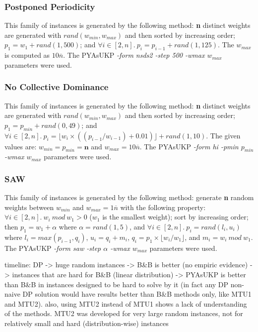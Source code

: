 \subsubsection{Postponed Periodicity}
This family of instances is generated by the following method: \textbf{n} distinct weights are generated with \(rand(w_{min}, w_{max})\) and then sorted by increasing order; \(p_1 = w_1 + rand(1, 500)\); and \(\forall i \in [2, n].~p_i = p_{i-1} + rand(1, 125)\). The \(w_{max}\) is computed as \(10\overline{n}\). The PYAsUKP \emph{-form nsds2 -step 500 -wmax \(w_{max}\)} parameters were used.

\subsubsection{No Collective Dominance}
This family of instances is generated by the following method: \textbf{n} distinct weights are generated with \(rand(w_{min}, w_{max})\) and then sorted by increasing order; \(p_1 = p_{min} + rand(0, 49)\); and \(\forall i \in [2, n].~p_i = \lfloor w_i \times ((p_{i-1}/w_{i-1}) + 0.01)\rfloor + rand(1, 10)\). The given values are: \(w_{min} = p_{min} = \mathbf{n}\) and \(w_{max} = 10\overline{n}\). The PYAsUKP \emph{-form hi -pmin \(p_{min}\) -wmax \(w_{max}\)} parameters were used.

\subsubsection{SAW}
This family of instances is generated by the following method: generate \textbf{n} random weights between \(w_{min}\) and \(w_{max} = 1\overline{n}\) with the following property: \(\forall i \in [2, n].~w_i~mod~w_1 > 0\) (\(w_1\) is the smallest weight); sort by increasing order; then \(p_1 = w_1 + \alpha\) where \(\alpha = rand(1,5)\), and \(\forall i \in [2, n].~p_i = rand(l_i, u_i)\) where \(l_i = max(p_{i-1}, q_i)\), \(u_i = q_i + m_i\), \(q_i = p_1 \times \lfloor w_i / w_1 \rfloor \), and \(m_i = w_i~mod~w_1\). The PYAsUKP \emph{-form saw -step \(\alpha\) -wmax \(w_{max}\)} parameters were used.

	timeline: DP -> huge random instances -> B\&B is better (no empiric evidence) -> instances that are hard for B\&B (linear distribution) -> PYAsUKP is better than B\&B in instances designed to be hard to solve by it (in fact any DP non-naive DP solution would have results better than B\&B methods only, like MTU1 and MTU2). also, using MTU2 instead of MTU1 shows a lack of understanding of the methods. MTU2 was developed for very large random instances, not for relatively small and hard (distribution-wise) instances

